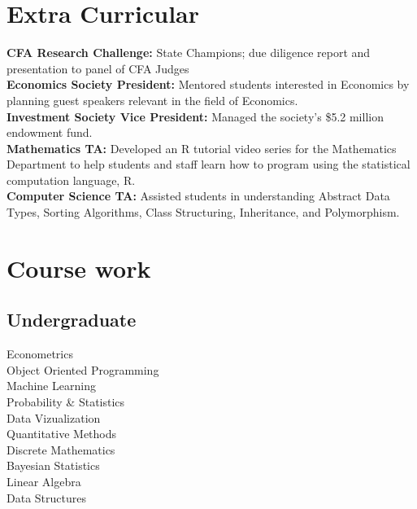 \documentclass[letterpaper]{deedy-resume}
\begin{document}
\begin{minipage}[t]{0.31\textwidth}
\section{Extra Curricular}
\textbf{CFA Research Challenge:} State Champions; due diligence 
report and presentation to panel of CFA Judges \\
\sectionspace
\textbf{Economics Society President:} Mentored students
interested in Economics by planning guest speakers relevant in the
field of Economics.\\
\sectionspace
\textbf{Investment Society Vice President:} Managed the
society's \$5.2 million endowment fund.\\
\sectionspace
\textbf{Mathematics TA:} Developed an R tutorial video series for the
Mathematics Department to help students and staff learn
how to program using the statistical computation language, R.\\
\sectionspace
\textbf{Computer Science TA:} Assisted students in understanding
Abstract Data Types, Sorting Algorithms, Class Structuring,
Inheritance, and Polymorphism.

\section{Course work}
\subsection{Undergraduate}
Econometrics \\
Object Oriented Programming \\
Machine Learning \\
Probability \& Statistics \\
Data Vizualization \\
Quantitative Methods \\
Discrete Mathematics \\
Bayesian Statistics \\
Linear Algebra \\
Data Structures 
\sectionspace 

\end{minipage} 
\hfill
%
%
\end{document}
